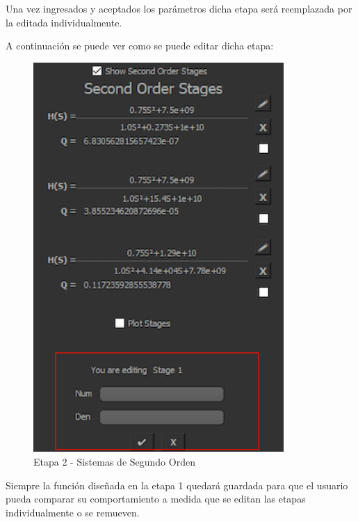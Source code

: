 Una vez ingresados y aceptados los parámetros dicha etapa será reemplazada por la editada individualmente.

A continuación se puede ver como se puede editar dicha etapa:

\begin{figure}[H]
    \centering
    \includegraphics[width=0.85\textwidth]{../Ejercicio1-FilterTool/Imagenes/sosEdit.png}
    \caption{Etapa 2 - Sistemas de Segundo Orden}
\end{figure}

Siempre la función diseñada en la etapa 1 quedará guardada para que el usuario pueda comparar su comportamiento a medida
que se editan las etapas individualmente o se remueven.


